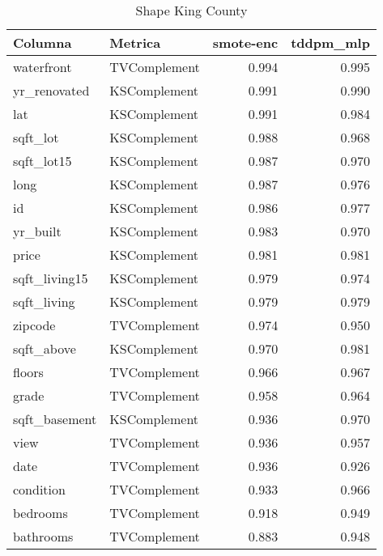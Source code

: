 \begin{table}[H]
\centering
\caption{Shape King County}
\label{table-shape-king county-a-3}
\begin{tabular}{|l|l|r|r|}
\hline
\rowcolor[gray]{0.8}
Columna & Metrica & smote-enc & tddpm\_mlp \\
\hline waterfront & TVComplement & 0.994 & \cellcolor[HTML]{EEEEEE} 0.995 \\
\hline yr\_renovated & KSComplement & \cellcolor[HTML]{EEEEEE} 0.991 & 0.990 \\
\hline lat & KSComplement & \cellcolor[HTML]{EEEEEE} 0.991 & 0.984 \\
\hline sqft\_lot & KSComplement & \cellcolor[HTML]{EEEEEE} 0.988 & 0.968 \\
\hline sqft\_lot15 & KSComplement & \cellcolor[HTML]{EEEEEE} 0.987 & 0.970 \\
\hline long & KSComplement & \cellcolor[HTML]{EEEEEE} 0.987 & 0.976 \\
\hline id & KSComplement & \cellcolor[HTML]{EEEEEE} 0.986 & 0.977 \\
\hline yr\_built & KSComplement & \cellcolor[HTML]{EEEEEE} 0.983 & 0.970 \\
\hline price & KSComplement & 0.981 & \cellcolor[HTML]{EEEEEE} 0.981 \\
\hline sqft\_living15 & KSComplement & \cellcolor[HTML]{EEEEEE} 0.979 & 0.974 \\
\hline sqft\_living & KSComplement & 0.979 & \cellcolor[HTML]{EEEEEE} 0.979 \\
\hline zipcode & TVComplement & \cellcolor[HTML]{EEEEEE} 0.974 & 0.950 \\
\hline sqft\_above & KSComplement & 0.970 & \cellcolor[HTML]{EEEEEE} 0.981 \\
\hline floors & TVComplement & 0.966 & \cellcolor[HTML]{EEEEEE} 0.967 \\
\hline grade & TVComplement & 0.958 & \cellcolor[HTML]{EEEEEE} 0.964 \\
\hline sqft\_basement & KSComplement & 0.936 & \cellcolor[HTML]{EEEEEE} 0.970 \\
\hline view & TVComplement & 0.936 & \cellcolor[HTML]{EEEEEE} 0.957 \\
\hline date & TVComplement & \cellcolor[HTML]{EEEEEE} 0.936 & 0.926 \\
\hline condition & TVComplement & 0.933 & \cellcolor[HTML]{EEEEEE} 0.966 \\
\hline bedrooms & TVComplement & 0.918 & \cellcolor[HTML]{EEEEEE} 0.949 \\
\hline bathrooms & TVComplement & 0.883 & \cellcolor[HTML]{EEEEEE} 0.948 \\
\hline
\end{tabular}
\end{table}
